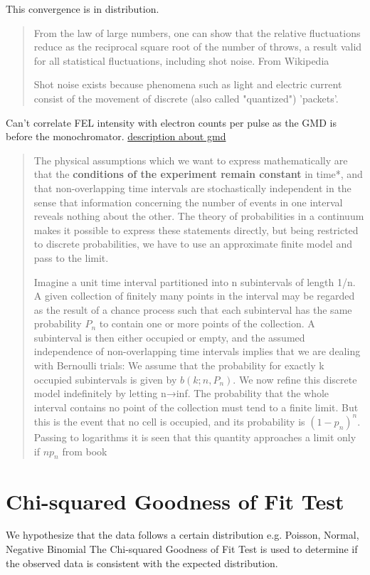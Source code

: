 This convergence is in distribution.
\begin{quotation}
    From the law of large numbers, one can show that the relative fluctuations reduce as the reciprocal square root of the number of throws, a result valid for all statistical fluctuations, including shot noise. From Wikipedia
    
    Shot noise exists because phenomena such as light and electric current consist of the movement of discrete (also called "quantized") 'packets'.
\end{quotation}

Can't correlate FEL intensity with electron counts per pulse as the GMD is before the monochromator.  \href{https://photon-science.desy.de/facilities/flash/photon_diagnostics/gmd_intensity_and_position/index_eng.html}{description about gmd}

\begin{quotation}
    The physical assumptions which we want to express mathematically are that the \textbf{conditions of the experiment remain constant} in time*, and that non-overlapping time intervals are stochastically independent in the sense that information concerning the number of events in one interval reveals nothing about the other. The theory of probabilities in a continuum makes it possible to express these statements directly, but being restricted to discrete probabilities, we have to use an approximate finite model and pass to the limit.

    Imagine a unit time interval partitioned into n subintervals of length 1/n. A given collection of finitely many points in the interval may be regarded as the result of a chance process such that each subinterval has the same probability $P_{n}$ to contain one or more points of the collection. A subinterval is then either occupied or empty, and the assumed independence of non-overlapping time intervals implies that we are dealing with Bernoulli trials: We assume that the probability for exactly k occupied subintervals is given by $b(k;n,P_{n})$. We now refine this discrete model indefinitely by letting n→inf. The probability that the whole interval contains no point of the collection must tend to a finite limit. But this is the event that no cell is occupied, and its probability is $(1-p_{n})^{n}$. Passing to logarithms it is seen that this quantity approaches a limit only if $np_{n}$
    from book \cite{fellerIntroductionProbabilityTheory1968}
\end{quotation}

\section{Chi-squared Goodness of Fit Test}
We hypothesize that the data follows a certain distribution e.g. Poisson, Normal, Negative Binomial The Chi-squared Goodness of Fit Test is used to determine if the observed data is consistent with the expected distribution.

